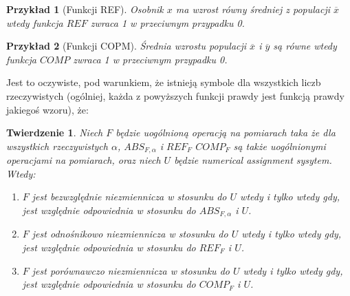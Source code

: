 \documentclass[12pt,a4paper]{report}
\newtheorem{przyklad}{Przykład}
\newtheorem{tw}[definition]{Twierdzenie}
\begin{document}
\begin{przyklad}[Funkcji REF]
Osobnik $x$ ma wzrost równy średniej z populacji $\overline{x}$ wtedy funkcja $REF$ zwraca 1 w przeciwnym przypadku 0.
\end{przyklad}
\begin{przyklad}[Funkcji COPM]
Średnia wzrostu populacji $\overline{x}$ i $\overline{y}$ są równe wtedy funkcja $COMP$ zwraca 1 w przeciwnym przypadku 0.
\end{przyklad}
Jest to oczywiste, pod warunkiem, że istnieją symbole dla wszystkich liczb rzeczywistych (ogólniej, każda z powyższych funkcji prawdy jest funkcją prawdy jakiegoś wzoru), że:
\begin{tw}
Niech $F$ będzie uogólnioną operacją na pomiarach taka że dla wszystkich rzeczywistych $\alpha$, $ABS_{F,\alpha}$ i $REF_{F}$ $COMP_{F}$ są także uogólnionymi operacjami na pomiarach, oraz niech $U$ będzie numerical assignment sysytem. Wtedy:
\begin{enumerate}
\item
$F$ jest bezwzględnie niezmiennicza w stosunku do $U$ wtedy i tylko wtedy gdy, jest względnie odpowiednia w stosunku do $ABS_{F,\alpha}$ i $U$.
\item
$F$ jest odnośnikowo niezmiennicza w stosunku do $U$ wtedy i tylko wtedy gdy, jest względnie odpowiednia w stosunku do $REF_{F}$ i $U$.  
\item
$F$ jest porównawczo niezmiennicza w stosunku do $U$ wtedy i tylko wtedy gdy, jest względnie odpowiednia w stosunku do $COMP_{F}$ i $U$.    
\end{enumerate}
\end{tw}
\end{document}
